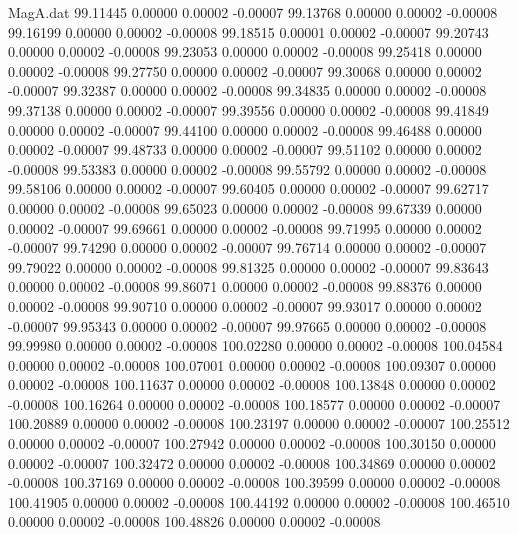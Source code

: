 \begin{filecontents}{MagA.dat}
  99.11445    0.00000    0.00002   -0.00007
  99.13768    0.00000    0.00002   -0.00008
  99.16199    0.00000    0.00002   -0.00008
  99.18515    0.00001    0.00002   -0.00007
  99.20743    0.00000    0.00002   -0.00008
  99.23053    0.00000    0.00002   -0.00008
  99.25418    0.00000    0.00002   -0.00008
  99.27750    0.00000    0.00002   -0.00007
  99.30068    0.00000    0.00002   -0.00007
  99.32387    0.00000    0.00002   -0.00008
  99.34835    0.00000    0.00002   -0.00008
  99.37138    0.00000    0.00002   -0.00007
  99.39556    0.00000    0.00002   -0.00008
  99.41849    0.00000    0.00002   -0.00007
  99.44100    0.00000    0.00002   -0.00008
  99.46488    0.00000    0.00002   -0.00007
  99.48733    0.00000    0.00002   -0.00007
  99.51102    0.00000    0.00002   -0.00008
  99.53383    0.00000    0.00002   -0.00008
  99.55792    0.00000    0.00002   -0.00008
  99.58106    0.00000    0.00002   -0.00007
  99.60405    0.00000    0.00002   -0.00007
  99.62717    0.00000    0.00002   -0.00008
  99.65023    0.00000    0.00002   -0.00008
  99.67339    0.00000    0.00002   -0.00007
  99.69661    0.00000    0.00002   -0.00008
  99.71995    0.00000    0.00002   -0.00007
  99.74290    0.00000    0.00002   -0.00007
  99.76714    0.00000    0.00002   -0.00007
  99.79022    0.00000    0.00002   -0.00008
  99.81325    0.00000    0.00002   -0.00007
  99.83643    0.00000    0.00002   -0.00008
  99.86071    0.00000    0.00002   -0.00008
  99.88376    0.00000    0.00002   -0.00008
  99.90710    0.00000    0.00002   -0.00007
  99.93017    0.00000    0.00002   -0.00007
  99.95343    0.00000    0.00002   -0.00007
  99.97665    0.00000    0.00002   -0.00008
  99.99980    0.00000    0.00002   -0.00008
 100.02280    0.00000    0.00002   -0.00008
 100.04584    0.00000    0.00002   -0.00008
 100.07001    0.00000    0.00002   -0.00008
 100.09307    0.00000    0.00002   -0.00008
 100.11637    0.00000    0.00002   -0.00008
 100.13848    0.00000    0.00002   -0.00008
 100.16264    0.00000    0.00002   -0.00008
 100.18577    0.00000    0.00002   -0.00007
 100.20889    0.00000    0.00002   -0.00008
 100.23197    0.00000    0.00002   -0.00007
 100.25512    0.00000    0.00002   -0.00007
 100.27942    0.00000    0.00002   -0.00008
 100.30150    0.00000    0.00002   -0.00007
 100.32472    0.00000    0.00002   -0.00008
 100.34869    0.00000    0.00002   -0.00008
 100.37169    0.00000    0.00002   -0.00008
 100.39599    0.00000    0.00002   -0.00008
 100.41905    0.00000    0.00002   -0.00008
 100.44192    0.00000    0.00002   -0.00008
 100.46510    0.00000    0.00002   -0.00008
 100.48826    0.00000    0.00002   -0.00008

\end{filecontents}
